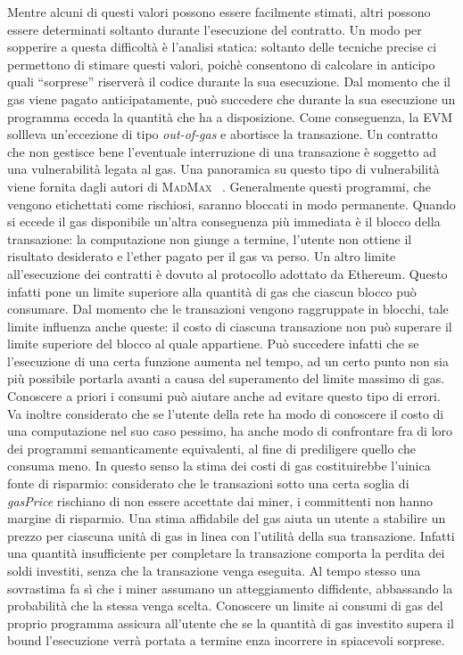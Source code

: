 	Mentre alcuni di questi valori possono essere facilmente stimati, altri possono essere determinati soltanto durante l'esecuzione del contratto. Un modo per sopperire a questa difficoltà è l'analisi statica: soltanto delle tecniche precise ci permettono di stimare questi valori, poichè consentono di calcolare in anticipo quali ``sorprese'' riserverà il codice durante la sua esecuzione.\newline
	\indent Dal momento che il gas viene pagato anticipatamente, può succedere che durante la sua
	esecuzione un programma ecceda la quantità che ha a disposizione. Come conseguenza, la EVM
	sollleva un'eccezione di tipo \textit{out-of-gas} e abortisce la transazione. Un contratto
	che non gestisce bene l'eventuale interruzione di una transazione è soggetto ad una 
	vulnerabilità legata al gas. Una panoramica su questo tipo di vulnerabilità viene fornita dagli autori di \textsc{MadMax} ~\cite{grech2018madmax}. Generalmente questi programmi, che vengono etichettati
	come rischiosi, saranno bloccati in modo permanente.
	Quando si eccede il gas disponibile un'altra conseguenza più immediata è il
	blocco della transazione: la computazione non giunge a termine, l'utente non ottiene il
	risultato desiderato e l'ether pagato per il gas va perso.\newline
	\indent Un altro limite all'esecuzione dei contratti è dovuto al protocollo adottato da Ethereum.
	Questo infatti pone un limite superiore alla quantità di gas che ciascun blocco può consumare. Dal momento che le transazioni vengono raggruppate in blocchi,
	tale limite influenza anche queste: il costo di ciascuna transazione non può superare il limite superiore del blocco al quale appartiene. Può succedere infatti che
	se l'esecuzione di una certa funzione aumenta nel tempo, ad un certo punto non sia
	più possibile portarla avanti a causa del superamento del limite massimo di gas.
	Conoscere a priori i consumi può aiutare anche ad evitare questo tipo di errori.\newline
	\indent Va inoltre considerato che se l'utente della rete ha modo di conoscere il costo
	di una computazione nel suo caso pessimo, ha anche modo di confrontare fra di loro dei programmi
	semanticamente equivalenti, al fine di prediligere quello che consuma meno.  In questo 
	senso la stima dei costi di gas costituirebbe l'uinica fonte di risparmio: considerato
	che le transazioni sotto una certa soglia di \textit{gasPrice} rischiano di non essere 
	accettate dai miner, i committenti non hanno margine di risparmio.\newline
	\indent Una stima affidabile del gas aiuta un utente a stabilire un prezzo per ciascuna
	unità di gas in linea con l'utilità della sua transazione. Infatti una quantità 
	insufficiente per completare la transazione comporta la perdita dei soldi investiti,
	senza che la transazione venga eseguita. Al tempo stesso una sovrastima fa sì che i
	miner assumano un atteggiamento diffidente, abbassando la probabilità che la stessa
	venga scelta.\newline
	\indent Conoscere un limite ai consumi di gas del proprio programma assicura all'utente
	che se la quantità di gas investito supera il bound l'esecuzione verrà portata a termine
	 enza incorrere in spiacevoli sorprese.


	\newpage
